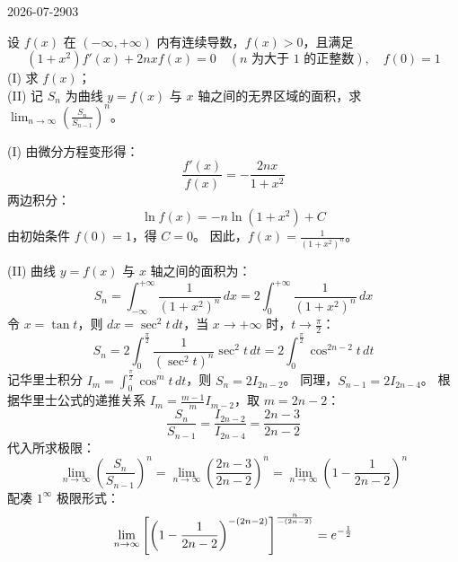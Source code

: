 \begin{mistake}{2026-07-29}{03}

\begin{problemcontent}
设 \(f(x)\) 在 \((-\infty, +\infty)\) 内有连续导数，\(f(x) > 0\)，且满足
\[ (1+x^2)f'(x) + 2nxf(x) = 0 \quad (n \text{ 为大于 } 1 \text{ 的正整数}), \quad f(0) = 1 \]
(I) 求 \(f(x)\)； \\
(II) 记 \(S_n\) 为曲线 \(y = f(x)\) 与 \(x\) 轴之间的无界区域的面积，求 \(\lim_{n \to \infty} \left( \frac{S_n}{S_{n-1}} \right)^n\)。
\end{problemcontent}

\begin{solutioncontent}
(I) 由微分方程变形得：
\[ \frac{f'(x)}{f(x)} = -\frac{2nx}{1+x^2} \]
两边积分：
\[ \ln f(x) = -n \ln(1+x^2) + C \]
由初始条件 \(f(0) = 1\)，得 \(C = 0\)。
因此，\(f(x) = \frac{1}{(1+x^2)^n}\)。

(II) 曲线 \(y=f(x)\) 与 \(x\) 轴之间的面积为：
\[ S_n = \int_{-\infty}^{+\infty} \frac{1}{(1+x^2)^n} \, dx = 2 \int_{0}^{+\infty} \frac{1}{(1+x^2)^n} \, dx \]
令 \(x = \tan t\)，则 \(dx = \sec^2 t \, dt\)，当 \(x \to +\infty\) 时，\(t \to \frac{\pi}{2}\)：
\[ S_n = 2 \int_{0}^{\frac{\pi}{2}} \frac{1}{(\sec^2 t)^n} \sec^2 t \, dt = 2 \int_{0}^{\frac{\pi}{2}} \cos^{2n-2} t \, dt \]
记华里士积分 \(I_m = \int_{0}^{\frac{\pi}{2}} \cos^m t \, dt\)，则 \(S_n = 2 I_{2n-2}\)。
同理，\(S_{n-1} = 2 I_{2n-4}\)。
根据华里士公式的递推关系 \(I_m = \frac{m-1}{m} I_{m-2}\)，取 \(m = 2n-2\)：
\[ \frac{S_n}{S_{n-1}} = \frac{I_{2n-2}}{I_{2n-4}} = \frac{2n-3}{2n-2} \]
代入所求极限：
\[ \lim_{n \to \infty} \left( \frac{S_n}{S_{n-1}} \right)^n = \lim_{n \to \infty} \left( \frac{2n-3}{2n-2} \right)^n = \lim_{n \to \infty} \left( 1 - \frac{1}{2n-2} \right)^n \]
配凑 \(1^\infty\) 极限形式：
\[ \lim_{n \to \infty} \left[ \left( 1 - \frac{1}{2n-2} \notag\right)^{-(2n-2)} \right]^{\frac{n}{-(2n-2)}} = e^{-\frac{1}{2}} \]
\end{solutioncontent}


\end{mistake}
